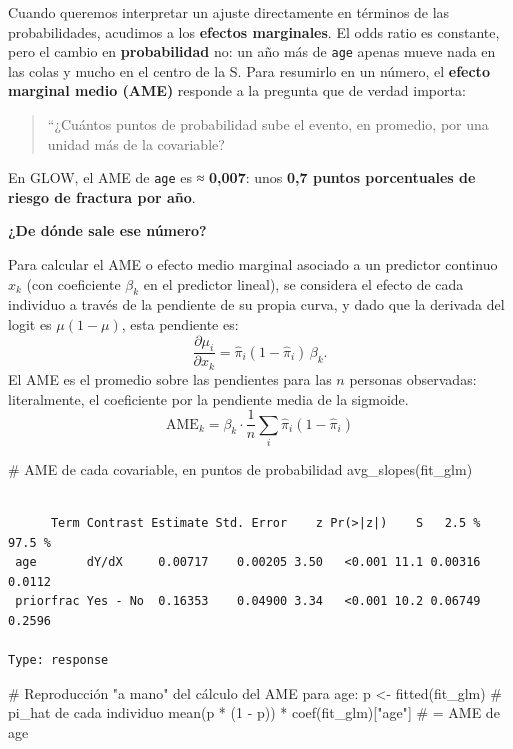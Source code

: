 \documentclass[
  letterpaper,
  DIV=11,
  numbers=noendperiod]{scrartcl}
\newenvironment{Shaded}{\begin{snugshade}}{\end{snugshade}}
\newcommand{\CommentTok}[1]{\textcolor[rgb]{0.37,0.37,0.37}{#1}}
\newcommand{\DecValTok}[1]{\textcolor[rgb]{0.68,0.00,0.00}{#1}}
\newcommand{\FunctionTok}[1]{\textcolor[rgb]{0.28,0.35,0.67}{#1}}
\newcommand{\NormalTok}[1]{\textcolor[rgb]{0.00,0.23,0.31}{#1}}
\newcommand{\OtherTok}[1]{\textcolor[rgb]{0.00,0.23,0.31}{#1}}
\newcommand{\SpecialCharTok}[1]{\textcolor[rgb]{0.37,0.37,0.37}{#1}}
\newcommand{\StringTok}[1]{\textcolor[rgb]{0.13,0.47,0.30}{#1}}
\begin{document}
Cuando queremos interpretar un ajuste directamente en términos de las
probabilidades, acudimos a los \textbf{efectos marginales}. El odds
ratio es constante, pero el cambio en \textbf{probabilidad} no: un año
más de \texttt{age} apenas mueve nada en las colas y mucho en el centro
de la S. Para resumirlo en un número, el \textbf{efecto marginal medio
(AME)} responde a la pregunta que de verdad importa:

\begin{quote}
``¿Cuántos puntos de probabilidad sube el evento, en promedio, por una
unidad más de la covariable?
\end{quote}

En GLOW, el AME de \texttt{age} es ≈ \textbf{0,007}: unos \textbf{0,7
puntos porcentuales de riesgo de fractura por año}.

\textbf{¿De dónde sale ese número?}

Para calcular el AME o efecto medio marginal asociado a un predictor
continuo \(x_k\) (con coeficiente \(\beta_k\) en el predictor lineal),
se considera el efecto de cada individuo a través de la pendiente de su
propia curva, y dado que la derivada del logit es \(\mu(1-\mu)\), esta
pendiente es:
\[\frac{\partial\mu_i}{\partial x_k}=\hat\pi_i(1-\hat\pi_i)\,\beta_k.\]
El AME es el promedio sobre las pendientes para las \(n\) personas
observadas: literalmente, el coeficiente por la pendiente media de la
sigmoide.
\[\text{AME}_k=\beta_k\cdot\frac{1}{n}\sum_i \hat\pi_i(1-\hat\pi_i)\]

\begin{Shaded}
\begin{Highlighting}[]
\CommentTok{\# AME de cada covariable, en puntos de probabilidad}
\FunctionTok{avg\_slopes}\NormalTok{(fit\_glm)                       }
\end{Highlighting}
\end{Shaded}

\begin{verbatim}

      Term Contrast Estimate Std. Error    z Pr(>|z|)    S   2.5 % 97.5 %
 age       dY/dX     0.00717    0.00205 3.50   <0.001 11.1 0.00316 0.0112
 priorfrac Yes - No  0.16353    0.04900 3.34   <0.001 10.2 0.06749 0.2596

Type: response
\end{verbatim}

\begin{Shaded}
\begin{Highlighting}[]
\CommentTok{\# Reproducción "a mano" del cálculo del AME para \textquotesingle{}age\textquotesingle{}:}
\NormalTok{p }\OtherTok{\textless{}{-}} \FunctionTok{fitted}\NormalTok{(fit\_glm)                      }\CommentTok{\# pi\_hat de cada individuo}
\FunctionTok{mean}\NormalTok{(p }\SpecialCharTok{*}\NormalTok{ (}\DecValTok{1} \SpecialCharTok{{-}}\NormalTok{ p)) }\SpecialCharTok{*} \FunctionTok{coef}\NormalTok{(fit\_glm)[}\StringTok{"age"}\NormalTok{]  }\CommentTok{\# = AME de age}
\end{Highlighting}
\end{Shaded}
\end{document}
